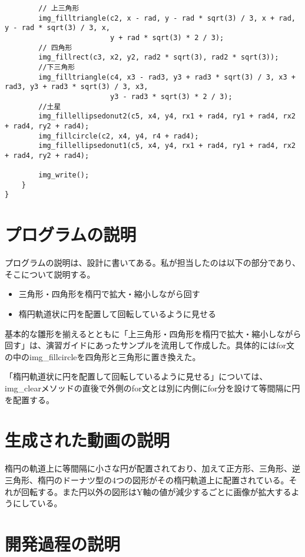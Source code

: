 \documentclass[12pt,a4j]{jarticle}
\begin{document}
\begin{verbatim}
        // 上三角形
        img_filltriangle(c2, x - rad, y - rad * sqrt(3) / 3, x + rad, y - rad * sqrt(3) / 3, x,
                         y + rad * sqrt(3) * 2 / 3);
        // 四角形
        img_fillrect(c3, x2, y2, rad2 * sqrt(3), rad2 * sqrt(3));
        //下三角形
        img_filltriangle(c4, x3 - rad3, y3 + rad3 * sqrt(3) / 3, x3 + rad3, y3 + rad3 * sqrt(3) / 3, x3,
                         y3 - rad3 * sqrt(3) * 2 / 3);
        //土星
        img_fillellipsedonut2(c5, x4, y4, rx1 + rad4, ry1 + rad4, rx2 + rad4, ry2 + rad4);
        img_fillcircle(c2, x4, y4, r4 + rad4);
        img_fillellipsedonut1(c5, x4, y4, rx1 + rad4, ry1 + rad4, rx2 + rad4, ry2 + rad4);

        img_write();
    }
}

\end{verbatim}

\section{プログラムの説明}

プログラムの説明は、設計に書いてある。私が担当したのは以下の部分であり、そこについて説明する。

\begin{itemize}
  \item 三角形・四角形を楕円で拡大・縮小しながら回す
  \item 楕円軌道状に円を配置して回転しているように見せる
\end{itemize}

基本的な雛形を揃えるとともに「上三角形・四角形を楕円で拡大・縮小しながら回す」は、演習ガイドにあったサンプルを流用して作成した。具体的にはfor文の中のimg_fillcircleを四角形と三角形に置き換えた。

「楕円軌道状に円を配置して回転しているように見せる」については、img_clearメソッドの直後で外側のfor文とは別に内側にfor分を設けて等間隔に円を配置する。

\section{生成された動画の説明}

楕円の軌道上に等間隔に小さな円が配置されており、加えて正方形、三角形、逆三角形、楕円のドーナツ型の4つの図形がその楕円軌道上に配置されている。それが回転する。また円以外の図形はY軸の値が減少するごとに画像が拡大するようにしている。

\section{開発過程の説明}
\end{document}

